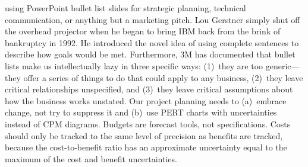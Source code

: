\documentclass{tufte-handout}
\begin{document}
 using PowerPoint bullet list slides for strategic
planning, technical communication, or anything but a marketing pitch.
Lou Gerstner simply shut off the overhead projector when he
began to bring IBM back from the brink of bankruptcy in 1992.
He introduced the novel idea of using complete sentences to describe
how goals would be met.%
Furthermore, 3M has documented%
that bullet lists make us intellectually
lazy in three specific ways: (1)~they are too generic---they offer a
series of things to do that could apply to any business, (2)~they leave
critical relationships unspecified, and (3)~they leave critical
assumptions about how the business works unstated.
Our project planning needs to (a)~embrace change, not try
to suppress it and (b)~use PERT charts with uncertainties
instead of CPM diagrams.%
Budgets are forecast tools, not specifications.
Costs should only be tracked to the same level of precision as benefits
are tracked, because the cost-to-benefit ratio has an approximate
uncertainty equal to the maximum of the cost and benefit uncertainties.%
\end{document}
